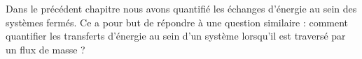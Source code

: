 Dans le précédent chapitre nous avons quantifié les échanges d’énergie au sein des systèmes fermés. Ce \courstrois a pour but de répondre à une question similaire : comment quantifier les transferts d’énergie au sein d’un système lorsqu’il est traversé par un flux de masse ?
